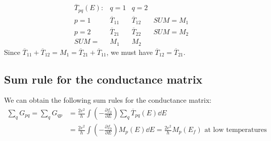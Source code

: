 \documentclass[11pt,a4paper]{book}
\theoremstyle{plain}
\theoremstyle{definition}
\theoremstyle{remark}
\begin{document}
\begin{equation}
    \begin{matrix}
        \overline{T}_{pq}(E): & q=1 & q=2 & \\
        p=1 & \overline{T}_{11} & \overline{T}_{12} & SUM = M_1 \\
        p=2 & \overline{T}_{21} & \overline{T}_{22} & SUM = M_2 \\
        SUM= & M_1 & M_2 &
    \end{matrix}
\end{equation}
Since $\overline{T}_{11} + \overline{T}_{12} = M_1 = \overline{T}_{21} + \overline{T}_{11}$, we must have $\overline{T}_{12} = \overline{T}_{21}$.
\subsection{Sum rule for the conductance matrix}
We can obtain the following sum rules for the conductance matrix:
\begin{equation}
    \begin{aligned}
        \sum_q G_{pq} = \sum_q G_{qp}
        & = \frac{2 e^2}{h} \int \left( -\frac{\partial f_0}{\partial E} \right) \sum_q \overline{T}_{pq}(E) \dd E \\
        & = \frac{2 e^2}{h} \int \left( -\frac{\partial f_0}{\partial E} \right) M_p(E) \dd E = \frac{2 e^2}{h} M_p(E_f) \mbox{ at low temperatures}
    \end{aligned}
\end{equation}
\end{document}
